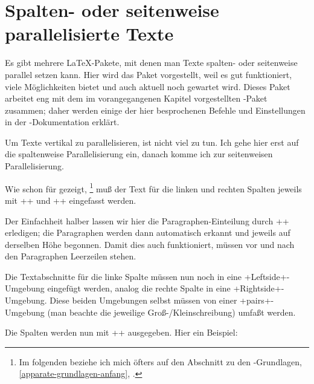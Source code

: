 
\newcommand\reledpar{\mbox{\Package{reledpar}}\xspace}

\section{Spalten- oder seitenweise parallelisierte Texte}

\DefineShortVerb{\+}

Es gibt mehrere \LaTeX-Pakete, mit denen man Texte spalten- oder seitenweise parallel setzen kann. Hier wird das Paket \reledpar vorgestellt, weil es gut funktioniert, viele Möglichkeiten bietet und auch aktuell noch gewartet wird. Dieses Paket arbeitet eng mit dem im vorangegangenen Kapitel vorgestellten \reledmac-Paket zusammen; daher werden einige der hier besprochenen Befehle und Einstellungen in der \reledmac-Dokumentation erklärt.

Um Texte vertikal zu parallelisieren, ist nicht viel zu tun. Ich gehe hier erst auf die spaltenweise Parallelisierung ein, danach komme ich zur seitenweisen Parallelisierung.

Wie schon für \reledmac gezeigt,%
\footnote{Im folgenden beziehe ich mich öfters auf den Abschnitt zu den \reledmac-Grundlagen, \cref{apparate-grundlagen-anfang}, .}
muß der Text für die linken und rechten Spalten jeweils mit +\beginnumbering+ und +\endnumbering+ eingefasst werden.%

Der Einfachheit halber lassen wir hier die Paragraphen-Einteilung durch +\autopar+ erledigen;
die Paragraphen werden dann automatisch erkannt und jeweils auf derselben Höhe begonnen. Damit dies auch funktioniert, müssen vor und nach den Paragraphen Leerzeilen stehen.

Die Textabschnitte für die linke Spalte müssen nun noch in eine +Leftside+-Umgebung eingefügt werden, analog die rechte Spalte in eine +Rightside+-Umgebung.
Diese beiden Umgebungen selbst müssen von einer +pairs+-Umgebung (man beachte die jeweilige Groß-/Kleinschreibung) umfaßt werden.

Die Spalten werden nun mit +\Columns+ ausgegeben. Hier ein Beispiel:



